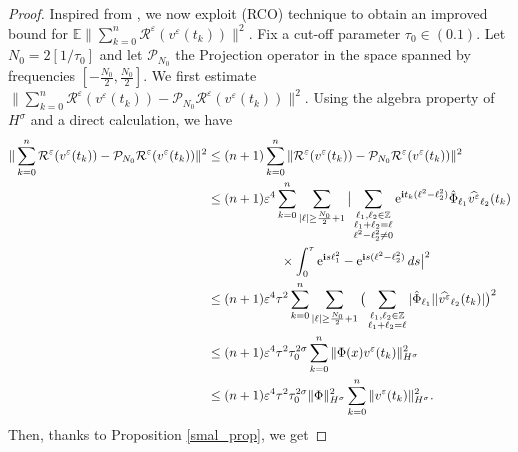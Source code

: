 \documentclass[a4paper]{amsart}
\begin{document}
\begin{proof}

Inspired from \cite{bao,fe_ka}, we now exploit (RCO) technique to obtain an improved bound for $\mathbb{E}\|\displaystyle\sum_{k=0}^n \mathcal{R}^\varepsilon(v^\varepsilon(t_k))\|^2$. Fix a cut-off parameter $\tau_0\in(0.1)$. Let $N_0=2[1/\tau_0]$ and let $\mathcal{P}_{N_0}$ the Projection operator in the space spanned by frequencies $[-\frac{N_0}{2},\frac{N_0}{2}]$. We first estimate $\|\sum_{k=0}^n \mathcal{R}^\varepsilon(v^\varepsilon(t_k))-\mathcal{P}_{N_0}\mathcal{R}^\varepsilon(v^\varepsilon(t_k))\|^2$. Using the algebra property of $H^\sigma$ and a direct calculation, we have
\begin{align*}
\|\sum_{k=0}^n \mathcal{R}^\varepsilon(v^\varepsilon(t_k))-\mathcal{P}_{N_0}\mathcal{R}^\varepsilon(v^\varepsilon(t_k))\|^2&\le (n+1)\displaystyle\sum_{k=0}^{n}\|\mathcal{R}^\varepsilon(v^\varepsilon(t_k))-\mathcal{P}_{N_0}\mathcal{R}^\varepsilon(v^\varepsilon(t_k))\|^2\\
&\le (n+1)\varepsilon^4\displaystyle\sum_{k=0}^{n}\displaystyle\sum_{|\ell|\ge \frac{N_0}{2}+1}\big|\displaystyle\sum_{\substack{\ell_1,\ell_2\in\mathbb{Z}\\ \ell_1+\ell_2=\ell\\\ell^2-\ell_2^2\ne 0}}{\rm e}^{{\bf i}t_k (\ell^2-\ell_2^2)}\hat{\Phi}_{\ell_1}\widehat{v^\varepsilon}_{\ell_2}(t_k)\\
&\hspace{2cm}\times \int_{0}^{\tau}{\rm e}^{{\bf i}s \ell_1^2}-{\rm e}^{{\bf i}s(\ell^2-\ell_2^2)}\,ds\big|^2\\
&\le (n+1)\varepsilon^4\tau^2 \displaystyle\sum_{k=0}^{n} \displaystyle\sum_{|\ell|\ge \frac{N_0}{2}+1}\big(\displaystyle\sum_{\substack{\ell_1,\ell_2\in\mathbb{Z}\\ \ell_1+\ell_2=\ell}}
|\hat{\Phi}_{\ell_1}||\widehat{v^\varepsilon}_{\ell_2}(t_k)|\big)^2\\
&\le (n+1)\varepsilon^4\tau^2 \tau_0^{2\sigma} \displaystyle\sum_{k=0}^n \|\Phi(x)v^\varepsilon(t_k)\|^2_{H^\sigma}\\
&\le (n+1)\varepsilon^4\tau^2 \tau_0^{2\sigma} \|\Phi\|^2_{H^\sigma}\displaystyle\sum_{k=0}^n \|v^\varepsilon(t_k)\|^2_{H^\sigma}.
\end{align*}
Then, thanks to Proposition \ref{smal_prop}, we get

\end{proof}
\end{document}
